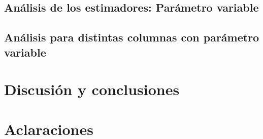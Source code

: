 \documentclass[10pt, a4paper]{article}
\begin{document}
		
	
\newpage
		
	\subsection{An\'alisis de los estimadores: Par\'ametro variable}

		
		
	\subsection{An\'alisis para distintas columnas con par\'ametro variable}
	
		
		
\section{Discusi\'on y conclusiones}

			
	
\section{Aclaraciones}

	
		
\end{document}
